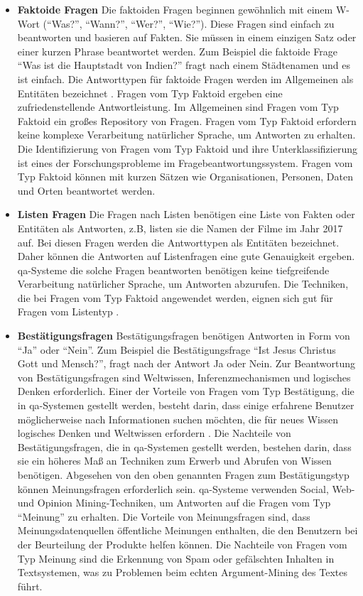 \documentclass[
        ngerman,
        paper=a4,
        numbers=noendperiod,
]{scrreprt}
\begin{document}
\begin{itemize}
    \item \textbf{Faktoide Fragen} 
    Die faktoiden Fragen beginnen gewöhnlich mit einem W-Wort (\enquote{Was?}, \enquote{Wann?}, \enquote{Wer?}, \enquote{Wie?}). Diese Fragen sind einfach zu beantworten und basieren auf Fakten. Sie müssen in einem einzigen Satz oder einer kurzen Phrase beantwortet werden. Zum Beispiel die faktoide Frage \enquote{Was ist die Hauptstadt von Indien?} fragt nach einem Städtenamen und es ist einfach. Die Antworttypen für faktoide Fragen werden im Allgemeinen als Entitäten bezeichnet \citep{khillare2014comparative}. Fragen vom Typ Faktoid ergeben eine zufriedenstellende Antwortleistung. Im Allgemeinen sind Fragen vom Typ Faktoid ein großes Repository von Fragen. Fragen vom Typ Faktoid erfordern keine komplexe Verarbeitung natürlicher Sprache, um Antworten zu erhalten. Die Identifizierung von Fragen vom Typ Faktoid und ihre Unterklassifizierung ist eines der Forschungsprobleme im Fragebeantwortungssystem. Fragen vom Typ Faktoid können mit kurzen Sätzen wie Organisationen, Personen, Daten und Orten beantwortet werden.
    \item \textbf{Listen Fragen}
    Die Fragen nach Listen benötigen eine Liste von Fakten oder Entitäten als Antworten, z.B, listen sie die Namen der Filme im Jahr 2017 auf. Bei diesen Fragen werden die Antworttypen als Entitäten bezeichnet. Daher können die Antworten auf Listenfragen eine gute Genauigkeit ergeben. \ac{qa}-Systeme die solche Fragen beantworten benötigen keine tiefgreifende Verarbeitung natürlicher Sprache, um Antworten abzurufen. Die Techniken, die bei Fragen vom Typ Faktoid angewendet werden, eignen sich gut für Fragen vom Listentyp \citep{wu2015leveraging}.
    \item \textbf{Bestätigungsfragen} 
    Bestätigungsfragen benötigen Antworten in Form von \enquote{Ja} oder \enquote{Nein}. Zum Beispiel die Bestätigungsfrage \enquote{Ist Jesus Christus Gott und Mensch?}, fragt nach der Antwort Ja oder Nein. Zur Beantwortung von Bestätigungsfragen sind Weltwissen, Inferenzmechanismen und logisches Denken erforderlich. Einer der Vorteile von Fragen vom Typ Bestätigung, die in \ac{qa}-Systemen gestellt werden, besteht darin, dass einige erfahrene Benutzer möglicherweise nach Informationen suchen möchten, die für neues Wissen logisches Denken und Weltwissen erfordern \citep{tanwar2014effective}. Die Nachteile von Bestätigungsfragen, die in \ac{qa}-Systemen gestellt werden, bestehen darin, dass sie ein höheres Maß an Techniken zum Erwerb und Abrufen von Wissen benötigen. Abgesehen von den oben genannten Fragen zum Bestätigungstyp können Meinungsfragen erforderlich sein. \ac{qa}-Systeme verwenden Social, Web- und Opinion Mining-Techniken, um Antworten auf die Fragen vom Typ \enquote{Meinung} zu erhalten. Die Vorteile von Meinungsfragen sind, dass Meinungsdatenquellen öffentliche Meinungen enthalten, die den Benutzern bei der Beurteilung der Produkte helfen können. Die Nachteile von Fragen vom Typ Meinung sind die Erkennung von Spam oder gefälschten Inhalten in Textsystemen, was zu Problemen beim echten Argument-Mining des Textes führt.

\end{itemize}
\end{document}
